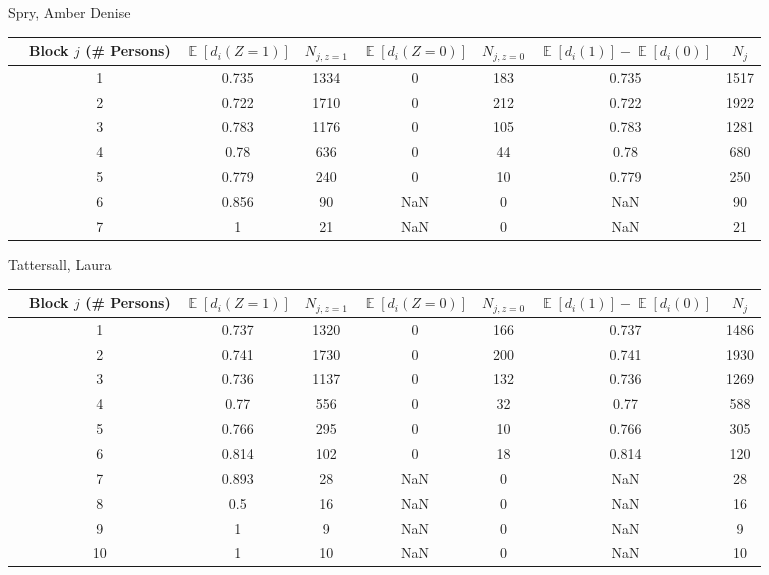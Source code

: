 \documentclass[11pt,notitlepage]{article}
\def\E{\mathop{\mathbb{E}}}
\begin{document}
\clearpage

Spry, Amber Denise
\begin{table}[h!]\small
\begin{center}
\begin{tabular}{rc|cc|cc|cc}
  \hline
 & Block $j$ (\# Persons) & $\E[d_i(Z=1)]$ & $N_{j, z=1}$ & $\E[d_i(Z=0)]$ & $N_{j, z=0}$ & $\E[d_i(1)]-\E[d_i(0)]$ & $N_j$ \\ 
  \hline
  & 1 & 0.735 & 1334 & 0 & 183 & 0.735 & 1517 \\ 
  & 2 & 0.722 & 1710 & 0 & 212 & 0.722 & 1922 \\ 
  & 3 & 0.783 & 1176 & 0 & 105 & 0.783 & 1281 \\ 
  & 4 & 0.78 & 636 & 0 & 44 & 0.78 & 680 \\ 
  & 5 & 0.779 & 240 & 0 & 10 & 0.779 & 250 \\ 
  & 6 & 0.856 & 90 & NaN & 0 & NaN & 90 \\ 
  & 7 & 1 & 21 & NaN & 0 & NaN & 21 \\ 
   \hline
\end{tabular}
\end{center}
\end{table}


Tattersall, Laura
\begin{table}[h!]\small
\begin{center}
\begin{tabular}{rc|cc|cc|cc}
  \hline
 & Block $j$ (\# Persons) & $\E[d_i(Z=1)]$ & $N_{j, z=1}$ & $\E[d_i(Z=0)]$ & $N_{j, z=0}$ & $\E[d_i(1)]-\E[d_i(0)]$ & $N_j$ \\ 
  \hline
  & 1 & 0.737 & 1320 & 0 & 166 & 0.737 & 1486 \\ 
  & 2 & 0.741 & 1730 & 0 & 200 & 0.741 & 1930 \\ 
  & 3 & 0.736 & 1137 & 0 & 132 & 0.736 & 1269 \\ 
  & 4 & 0.77 & 556 & 0 & 32 & 0.77 & 588 \\ 
  & 5 & 0.766 & 295 & 0 & 10 & 0.766 & 305 \\ 
  & 6 & 0.814 & 102 & 0 & 18 & 0.814 & 120 \\ 
  & 7 & 0.893 & 28 & NaN & 0 & NaN & 28 \\ 
  & 8 & 0.5 & 16 & NaN & 0 & NaN & 16 \\ 
  & 9 & 1 & 9 & NaN & 0 & NaN & 9 \\ 
   & 10 & 1 & 10 & NaN & 0 & NaN & 10 \\ 
   \hline
\end{tabular}
\end{center}
\end{table}
\end{document}
